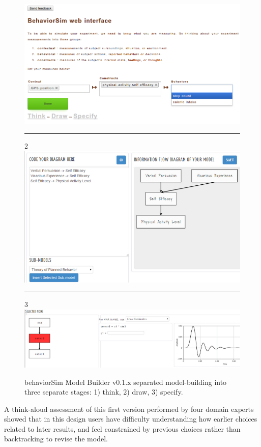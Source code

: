 \begin{figure}[!t]
  \includegraphics[width=0.9\columnwidth]{img/v1-think}
  \rule{\columnwidth}{0.4pt}
  2
  \includegraphics[width=0.9\columnwidth]{img/v1-draw}
  \rule{\columnwidth}{0.4pt}
  3
  \includegraphics[width=0.9\columnwidth]{img/v1-specify}  
  \caption{behaviorSim Model Builder v0.1.x separated model-building into three separate stages: 1) think, 2) draw, 3) specify.}
  \label{model-builder-v1}
\end{figure}

A think-aloud assessment of this first version performed by four domain experts showed that in this design users have difficulty understanding how earlier choices related to later results, and feel constrained by previous choices rather than backtracking to revise the model.

